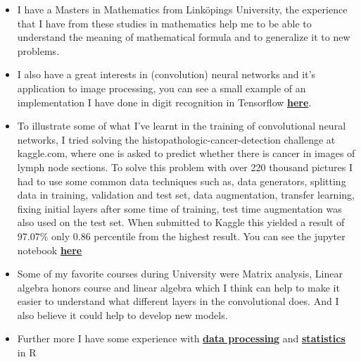 \documentclass[]{article}
\begin{document}
\begin{itemize}
\item
  I have a Masters in Mathematics from Linköpings University, the
  experience that I have from these studies in
  mathematics help me to be able to understand the meaning of mathematical
  formula and to generalize it to new problems.
\item
  I also have a great interests in (convolution) neural networks and
  it's application to image processing, you can see a small example of
  an implementation I have done in digit recognition in Tensorflow
  \href{https://github.com/HHA123/Job/blob/master/TensorflowNNdigit.ipynb}{\textbf{here}}.

\item
  To illustrate some of what I've learnt in the training of
 convolutional neural networks, I tried solving the histopathologic-cancer-detection challenge
 at kaggle.com, where one is asked to predict whether there is cancer
 in images of lymph node sections. To solve this problem with over 220 thousand
pictures I had to use some common data techniques such as, data generators,
 splitting data in training, validation and test set, data augmentation,
transfer learning, fixing initial layers after some time of training,
 test time augmentation was also used on the test set.
 When submitted to Kaggle this yielded a result of 97.07\% only 0.86 percentile
 from the highest result.
You can see the jupyter notebook \href{https://github.com/HHA123/Job/blob/master/histo-pat-cancer.ipynb}{\textbf{here}}

  

\item
 Some of my favorite courses during University were Matrix analysis, Linear algebra
honors course and linear algebra which
I think can help to make it easier to understand what
 different layers in the convolutional does. And I also believe it could help to develop
new models.

 


\item
  Further more I have some experience with
\href{htmlpreview.github.io/?https://github.com/HHA123/Job/blob/master/RepRes2.html}
{\textbf{data processing}} and
  \href{htmlpreview.github.io/?https://github.com/HHA123/Job/blob/master/Statinf2.Rmd}{\textbf{statistics}}
  in R



\end{itemize}
\end{document}
